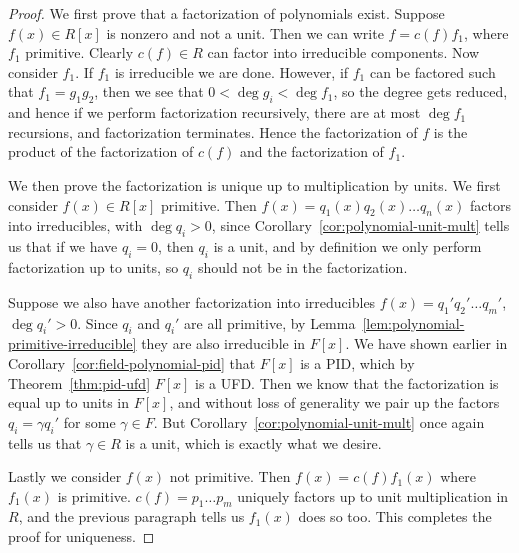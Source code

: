 \begin{proof}
    We first prove that a factorization of polynomials exist.
    Suppose \(f(x) \in R[x]\) is nonzero and not a unit.
    Then we can write \(f = c(f)f_1\), where \(f_1\) primitive.
    Clearly \(c(f) \in R\) can factor into irreducible components.
    Now consider \(f_1\).
    If \(f_1\) is irreducible we are done.
    However, if \(f_1\) can be factored such that \(f_1 = g_1 g_2\),
    then we see that \(0 < \deg g_i < \deg f_1\),
    so the degree gets reduced,
    and hence if we perform factorization recursively,
    there are at most \(\deg f_1\) recursions,
    and factorization terminates.
    Hence the factorization of \(f\)
    is the product of the factorization of \(c(f)\)
    and the factorization of \(f_1\).

    \medskip
    \pagebreak

    We then prove the factorization is unique up to multiplication by units.
    We first consider \(f(x) \in R[x]\) primitive.
    Then \(f(x) = q_1(x)q_2(x) \hdots q_n(x)\) factors into irreducibles,
    with \(\deg q_i > 0\),
    since Corollary~\ref{cor:polynomial-unit-mult} tells us that
    if we have \(q_i = 0\), then \(q_i\) is a unit,
    and by definition we only perform factorization up to units,
    so \(q_i\) should not be in the factorization.

    Suppose we also have another factorization into irreducibles
    \(f(x) = q_1' q_2' \hdots q_m'\), \(\deg q_i' > 0\).
    Since \(q_i\) and \(q_i'\) are all primitive,
    by Lemma~\ref{lem:polynomial-primitive-irreducible}
    they are also irreducible in \(F[x]\).
    We have shown earlier in Corollary~\ref{cor:field-polynomial-pid}
    that \(F[x]\) is a PID,
    which by Theorem~\ref{thm:pid-ufd} \(F[x]\) is a UFD.\@
    Then we know that the factorization is equal up to units in \(F[x]\),
    and without loss of generality we pair up the factors
    \(q_i = \gamma q_i'\) for some \(\gamma \in F\).
    But Corollary~\ref{cor:polynomial-unit-mult} once again tells us that
    \(\gamma \in R\) is a unit,
    which is exactly what we desire.

    Lastly we consider \(f(x)\) not primitive.
    Then \(f(x) = c(f)f_1(x)\) where \(f_1(x)\) is primitive.
    \(c(f) = p_1 \hdots p_m\) uniquely factors up to unit multiplication in \(R\),
    and the previous paragraph tells us \(f_1(x)\) does so too.
    This completes the proof for uniqueness.
\end{proof}

